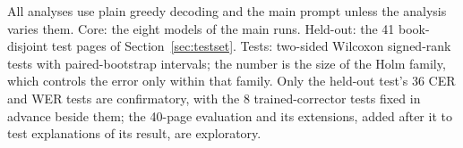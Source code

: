\begin{table}[t]
\begin{tabular}
\bottomrule
\end{tabular}
\par\smallskip
\begin{minipage}{\linewidth}\footnotesize All analyses use plain greedy decoding and the main prompt unless the analysis varies them. Core: the eight models of the main runs. Held-out: the 41 book-disjoint test pages of Section~\ref{sec:testset}. Tests: two-sided Wilcoxon signed-rank tests with paired-bootstrap intervals; the number is the size of the Holm family, which controls the error only within that family. Only the held-out test's 36 CER and WER tests are confirmatory, with the 8 trained-corrector tests fixed in advance beside them; the 40-page evaluation and its extensions, added after it to test explanations of its result, are exploratory.\end{minipage}
\end{table}
